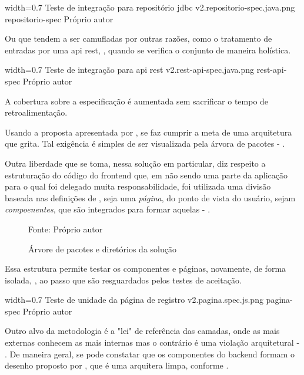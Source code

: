   \imagem
    {width=0.7\textwidth}
    {Teste de integração para repositório jdbc}
    {v2.repositorio-spec.java.png}
    {repositorio-spec}
    {Próprio autor}

  Ou que tendem a ser camufladas por outras razões, como o tratamento de entradas por uma api rest, , quando se verifica o conjunto de maneira holística.

  \imagem
    {width=0.7\textwidth}
    {Teste de integração para api rest}
    {v2.rest-api-spec.java.png}
    {rest-api-spec}
    {Próprio autor}

  A cobertura sobre a especificação é aumentada sem sacrificar o tempo de retroalimentação.

  Usando a proposta apresentada por , se faz cumprir a meta de uma arquitetura que grita. Tal exigência é simples de ser visualizada pela árvora de pacotes - .

  Outra liberdade que se toma, nessa solução em particular, diz respeito a estruturação do código do frontend que, em não sendo uma parte da aplicação para o qual foi delegado muita responsabilidade, foi utilizada uma divisão baseada nas definições de , seja uma \emph{página}, do ponto de vista do usuário, sejam \emph{compoenentes}, que são integrados para formar aquelas - .

  \begin{figure}[h]
    \centering
    \caption{Árvore de pacotes e diretórios da solução}
    \small{Fonte: Próprio autor}
  \end{figure}

  Essa estrutura permite testar os componentes e páginas, novamente, de forma isolada, , ao passo que são resguardados pelos testes de aceitação.

  \imagem
    {width=0.7\textwidth}
    {Teste de unidade da página de registro}
    {v2.pagina.spec.js.png}
    {pagina-spec}
    {Próprio autor}

  Outro alvo da metodologia é a "lei" de referência das camadas, onde as mais externas conhecem as mais internas mas o contrário é uma violação arquitetural - . De maneira geral, se pode constatar que os componentes do backend formam o desenho proposto por , que é uma arquitera limpa, conforme .
